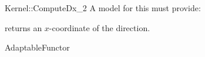 \begin{ccRefFunctionObjectConcept}{Kernel::ComputeDx_2}
A model for this must provide:



       {returns an $x$-coordinate of the direction.}

\ccRefines
AdaptableFunctor



\end{ccRefFunctionObjectConcept}
